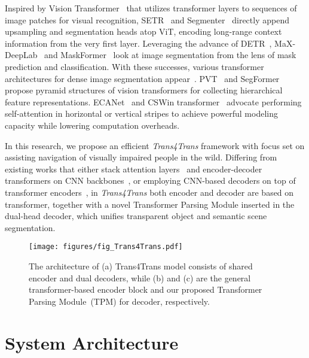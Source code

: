 \documentclass[journal]{IEEEtran}
\begin{document}
Inspired by Vision Transformer~\cite{vit} that utilizes transformer layers to sequences of image patches for visual recognition, SETR~\cite{setr} and Segmenter~\cite{segmenter} directly append upsampling and segmentation heads atop ViT, encoding long-range context information from the very first layer. Leveraging the advance of DETR~\cite{detr}, MaX-DeepLab~\cite{maxdeeplab} and MaskFormer~\cite{maskformer} look at image segmentation from the lens of mask prediction and classification. With these successes, various transformer architectures for dense image segmentation appear~\cite{swin,segformer,fully_transformer_networks}. PVT~\cite{pvt,wang2021pvtv2} and SegFormer~\cite{segformer} propose pyramid structures of vision transformers for collecting hierarchical feature representations. ECANet~\cite{yang2021capturing} and CSWin transformer~\cite{dong2021cswin} advocate performing self-attention in horizontal or vertical stripes to achieve powerful modeling capacity while lowering computation overheads.

In this research, we propose an efficient \emph{Trans4Trans} framework with focus set on assisting navigation of visually impaired people in the wild. Differing from existing works that either stack attention layers~\cite{danet,yang2021capturing} and encoder-decoder transformers on CNN backbones~\cite{xie2021segmenting}, or employing CNN-based decoders on top of transformer encoders~\cite{setr,pvt}, in \emph{Trans4Trans} both encoder and decoder are based on transformer, together with a novel Transformer Parsing Module inserted in the dual-head decoder, which unifies transparent object and semantic scene segmentation.





\begin{figure*}[!t]
    \centering
    \texttt{[image: figures/fig\_Trans4Trans.pdf]}
\caption{\small The architecture of (a) Trans4Trans model consists of shared encoder and dual decoders, while (b) and (c) are the general transformer-based encoder block and our proposed Transformer Parsing Module~(TPM) for decoder, respectively.}
    \label{fig:arch_trans4trans}
\end{figure*}

\section{System Architecture}
\end{document}
